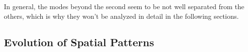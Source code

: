 In general, the modes beyond the second seem to be not well separated from the others, which is why they won't be analyzed in detail in the following sections. 

\subsection{Evolution of Spatial Patterns}
\label{sec:spatial pattern evolution}


%

